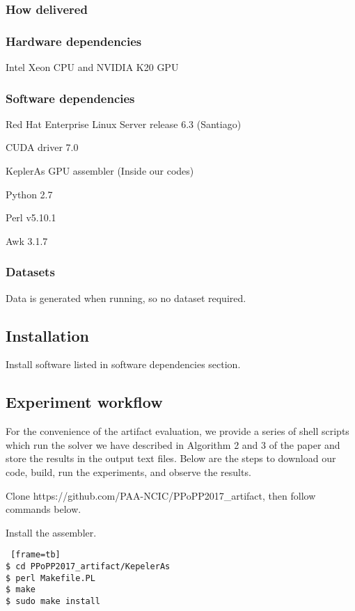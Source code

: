 \subsubsection{How delivered}


\subsubsection{Hardware dependencies}
Intel Xeon CPU and NVIDIA K20 GPU
\subsubsection{Software dependencies}
Red Hat Enterprise Linux Server release 6.3 (Santiago)

CUDA driver 7.0

KeplerAs GPU assembler (Inside our codes)

Python 2.7

Perl v5.10.1

Awk 3.1.7

\subsubsection{Datasets}
Data is generated when running, so no dataset required.
\subsection{Installation}
Install software listed in software dependencies section.


\subsection{Experiment workflow}
For the convenience of the artifact evaluation, we provide a series
of shell scripts which run the solver  we have described in Algorithm 2 and 3 of the paper and store the results in the output text files. Below are the steps to download our code, build, run the experiments, and observe the results.

Clone https://github.com/PAA-NCIC/PPoPP2017\_artifact, then follow commands below.

Install the assembler.
\begin{lstlisting} [frame=tb]
$ cd PPoPP2017_artifact/KepelerAs
$ perl Makefile.PL
$ make
$ sudo make install
\end{lstlisting}

